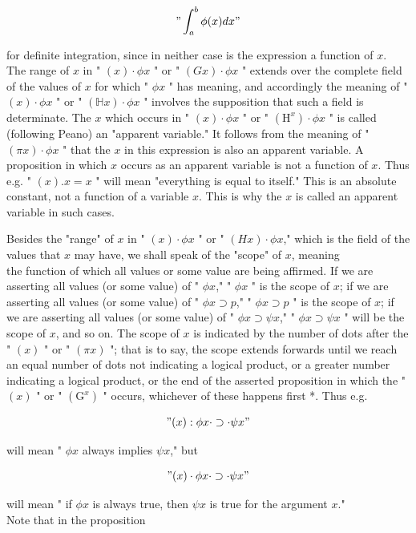 \documentclass[10pt]{article}
\begin{document}
$$
" \int_{a}^{b} \phi(x) d x "
$$

for definite integration, since in neither case is the expression a function of $x$.\\
The range of $x$ in " $(x) \cdot \phi x$ " or " $(G x) \cdot \phi x$ " extends over the complete field of the values of $x$ for which " $\phi x$ " has meaning, and accordingly the meaning of " $(x) \cdot \phi x$ " or " $(\mathbb{H} x) \cdot \phi x$ " involves the supposition that such a field is determinate. The $x$ which occurs in " $(x) \cdot \phi x$ " or " $\left(\mathrm{H}^{x}\right) \cdot \phi x$ " is called (following Peano) an "apparent variable." It follows from the meaning of " $(\pi x) \cdot \phi x$ " that the $x$ in this expression is also an apparent variable. A proposition in which $x$ occurs as an apparent variable is not a function of $x$. Thus e.g. " $(x) . x=x$ " will mean "everything is equal to itself." This is an absolute constant, not a function of a variable $x$. This is why the $x$ is called an apparent variable in such cases.

Besides the "range" of $x$ in " $(x) \cdot \phi x$ " or " $(H x) \cdot \phi x$," which is the field of the values that $x$ may have, we shall speak of the "scope" of $x$, meaning\\
the function of which all values or some value are being affirmed. If we are asserting all values (or some value) of " $\phi x$," " $\phi x$ " is the scope of $x$; if we are asserting all values (or some value) of " $\phi x \supset p$," " $\phi x \supset p$ " is the scope of $x$; if we are asserting all values (or some value) of " $\phi x \supset \psi x$," " $\phi x \supset \psi x$ " will be the scope of $x$, and so on. The scope of $x$ is indicated by the number of dots after the " $(x)$ " or " $(\pi x)$ "; that is to say, the scope extends forwards until we reach an equal number of dots not indicating a logical product, or a greater number indicating a logical product, or the end of the asserted proposition in which the " $(x)$ " or " $\left(\mathrm{G}^{x}\right)$ " occurs, whichever of these happens first *. Thus e.g.

$$
"(x): \phi x \cdot \supset \cdot \psi x "
$$

will mean " $\phi x$ always implies $\psi x$," but

$$
"(x) \cdot \phi x \cdot \supset \cdot \psi x "
$$

will mean " if $\phi x$ is always true, then $\psi x$ is true for the argument $x$."\\
Note that in the proposition
\end{document}
